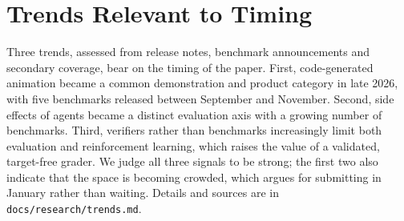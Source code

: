 \documentclass[11pt]{article}
\begin{document}
\section{Trends Relevant to Timing}
Three trends, assessed from release notes, benchmark announcements and secondary coverage, bear on the timing of the paper. First, code-generated animation became a common demonstration and product category in late 2026, with five benchmarks released between September and November. Second, side effects of agents became a distinct evaluation axis with a growing number of benchmarks. Third, verifiers rather than benchmarks increasingly limit both evaluation and reinforcement learning, which raises the value of a validated, target-free grader. We judge all three signals to be strong; the first two also indicate that the space is becoming crowded, which argues for submitting in January rather than waiting. Details and sources are in \texttt{docs/research/trends.md}.



\end{document}
